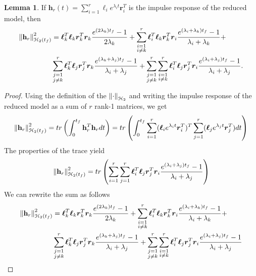 \documentclass[preprint]{elsarticle}
\theoremstyle{definition}
\theoremstyle{definition}
\def\mathcal{\EuScript}
\numberwithin{equation}{section}
\newtheorem{Lemma}[Theorem]{Lemma}
\newcommand{\h}{\mathbf{h}}
\newcommand{\tf}{t_f}
\newcommand{\rc}{\boldsymbol{r}}
\newcommand{\lc}{\boldsymbol{\ell}}
\newcommand{\ch}{\mathcal{H}}
\newcommand{\norm}[1]{\left\lVert#1\right\rVert}
\begin{document}
\begin{Lemma}\label{mnormexp}
If $\h_r(t)=\sum_{i=1}^r \lc_ie^{\lambda_it}\rc_i^T$ is the impulse response of the reduced model, then
\begin{equation}
\begin{aligned}
\norm{\h_r}_{\ch_2({\tf})}^2&= \lc_{k}^T\lc_{k}\rc_{k}^T\rc_{k}\dfrac{e^{(2\lambda_k){\tf}}-1}{2\lambda_k}+\sum_{\substack{i=1 \\i \neq k}}^r\lc_{i}^T\lc_{k}\rc_{k}^T\rc_{i}\dfrac{e^{(\lambda_i+\lambda_k){\tf}}-1}{\lambda_i+\lambda_k}+\\                             
&\sum_{\substack{j=1\\j\neq k}}^r\lc_{k}^T\lc_{j}\rc_{j}^T\rc_{k}\dfrac{e^{(\lambda_k+\lambda_j){\tf}}-1}{\lambda_i+\lambda_j}+\sum_{\substack{j=1\\j\neq k}}^r\sum_{\substack{i=1\\i\neq k}}^r\lc_{i}^T\lc_{j}\rc_{j}^T\rc_{i}\dfrac{e^{(\lambda_i+\lambda_j){\tf}}-1}{\lambda_i+\lambda_j}.
\end{aligned}
\end{equation}
\end{Lemma}
\begin{proof}
Using the definition of the $\norm{\cdot}_{\ch_2}$ and writing the impulse response of the reduced model as  a sum of $r$ rank-1 matrices, we get
\begin{align*}
\norm{\h_r}_{\ch_2({\tf})}^2=tr\left(\int_0^{\tf}\h_r^T\h_r dt\right)=tr\left(\int_0^{\tf}\sum_{i=1}^r(\lc_{i}e^{\lambda_it}\rc_{i}^T)^T\sum_{j=1}^r(\lc_{j}e^{\lambda_jt}\rc_{j}^T)dt\right)\\
\end{align*}
The properties  of the trace yield 
\begin{align*}
\norm{\h_r}_{\ch_2({\tf})}^2=tr\left( \sum_{i=1}^r\sum_{j=1}^r\lc_{i}^T\lc_{j}\rc_{j}^T\rc_{i}\dfrac{e^{(\lambda_i+\lambda_j){\tf}}-1}{\lambda_i+\lambda_j} \right)
\end{align*}
We can rewrite the sum as follows
\begin{align*}
\norm{\h_r}_{\ch_2({\tf})}^2&= \lc_{k}^T\lc_{k}\rc_{k}^T\rc_{k}\dfrac{e^{(2\lambda_k){\tf}}-1}{2\lambda_k}+\sum_{\substack{i=1 \\i \neq k}}^r\lc_{i}^T\lc_{k}\rc_{k}^T\rc_{i}\dfrac{e^{(\lambda_i+\lambda_k){\tf}}-1}{\lambda_i+\lambda_k}+\\                             
&\sum_{\substack{j=1\\j\neq k}}^r\lc_{k}^T\lc_{j}\rc_{j}^T\rc_{k}\dfrac{e^{(\lambda_k+\lambda_j){\tf}}-1}{\lambda_i+\lambda_j}+\sum_{\substack{j=1\\j\neq k}}^r\sum_{\substack{i=1\\i\neq k}}^r\lc_{i}^T\lc_{j}\rc_{j}^T\rc_{i}\dfrac{e^{(\lambda_i+\lambda_j){\tf}}-1}{\lambda_i+\lambda_j}
\end{align*}
\end{proof}
\end{document}
